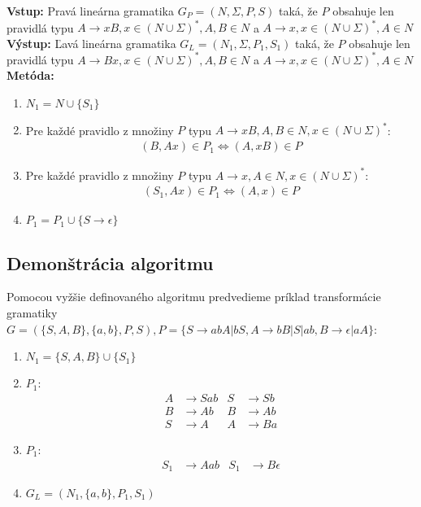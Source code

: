 \documentclass[10pt]{article}
\begin{document}
\textbf{Vstup:} Pravá lineárna gramatika $G_P = (N, \Sigma, P, S)$ taká, že $P$ obsahuje len pravidlá typu
$A\to xB, x \in (N\cup\Sigma)^*, A,B \in N$ a $A\to x, x \in (N\cup\Sigma)^*, A \in N$\\
\textbf{Výstup:} Ľavá lineárna gramatika $G_L = (N_1, \Sigma, P_1, S_1)$ taká, že $P$ obsahuje len pravidlá typu
$A\to Bx, x \in (N\cup\Sigma)^*, A,B \in N$ a $A\to x, x \in (N\cup\Sigma)^*, A \in N$\\
\textbf{Metóda:}
\begin{enumerate}
    \item $N_1 = N \cup \{S_1\}$
    \item Pre každé pravidlo z množiny $P$ typu $A\to xB, A,B \in N, x \in (N\cup\Sigma)^*$:\\
        \begin{align*}
            (B,Ax) \in P_1 \iff (A, xB) \in P
        \end{align*}
    \item Pre každé pravidlo z množiny $P$ typu $A\to x, A \in N, x \in (N\cup\Sigma)^*$:\\
        \begin{align*}
            (S_1,Ax) \in P_1 \iff (A, x) \in P
        \end{align*}
    \item $P_1 = P_1 \cup \{S\to\epsilon\}$
\end{enumerate}

\subsection*{Demonštrácia algoritmu}
Pomocou vyžšie definovaného algoritmu predvedieme príklad transformácie gramatiky $G = (\{S,A,B\}, \{a, b\}, P, S),
P = \{S\to abA|bS, A\to bB|S|ab, B\to \epsilon | aA \}$:
\begin{enumerate}
    \item $N_1 = \{S, A, B\} \cup \{ S_1\}$
    \item $P_1$: 
            \begin{align*}
                A&\to Sab  & S&\to Sb\\
                B&\to Ab   & B&\to Ab\\
                S&\to A    & A&\to Ba
            \end{align*}
    \item $P_1$: 
            \begin{align*}
                S_1&\to Aab & S_1&\to B\epsilon
            \end{align*}
    \item $G_L = (N_1, \{a,b\}, P_1, S_1)$

\end{enumerate}
\end{document}
